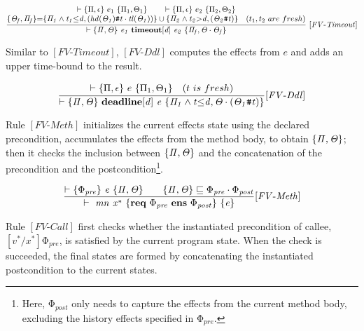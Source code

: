 \documentclass[acmsmall,10pt,review]{acmart}
\newcommand{\effect}{{\ensuremath{\mathrm{\Phi}}}}
\newcommand{\code}[1]{{\tt{\ensuremath{\m{#1}}}}}
\newcommand{\CONTAIN}{\sqsubseteq}
\newcommand{\m}{\mathit}
\newcommand{\mysharp}{{\mathrel{\texttt{\#}}}}
\begin{document}
{{{\small\begin{gather*}
  \code{\frac{
    \begin{matrix}
      \vdash \{\Pi, \epsilon \}\ e_1 \ \{  \Pi_1, \Theta_1\} 
      \qquad 
      \vdash \{ \Pi, \epsilon \}\ e_2 \ \{  \Pi_2, \Theta_2 \} 
      \\
      \s{\Theta_f, \Pi_f} {=} \s{\Pi_1  \wedge t_1{\leq}d, (hd(\Theta_1)\mysharp t \cdot tl(\Theta_1))}
      \cup 
  \s{\Pi_2  \wedge t_2{>}d,  (\Theta_2\mysharp t)}   
  \quad (t_1, t_2\ are\ fresh)     
\end{matrix}
  }
  {\vdash \s{ \Pi, \Theta} \  
  e_1\ \textbf{timeout} [d] \  e_2
   \ \s{\Pi_f, \Theta \cdot \Theta_f} } \   {[FV\text{-}Timeout]}} 
\end{gather*}}}


Similar to \code{[FV\text{-}Timeout]}, \code{[FV\text{-}Ddl]} computes the effects 
from \code{e} and adds an upper time-bound to the result. 

{{\small\begin{gather*}
  \code{\frac{
    \begin{matrix}
      \vdash \{ \Pi, \epsilon\}\ e \ \{  \Pi_1, \Theta_1\} 
  \quad (t\ is\ fresh)     
\end{matrix}
  }
  {\vdash \s{ \Pi, \Theta} \  
  \textbf{deadline}  [d] \ e 
   \ \s{\Pi_1  \wedge t{\leq}d, \Theta  \cdot (\Theta_1\mysharp t)} }   
    {[FV\text{-}Ddl]}} 
  \end{gather*}}}


  Rule \code{[FV\text{-}Meth]} initializes the current effects state 
using the declared precondition, accumulates the effects from the method body, 
to obtain \code{ \s{\Pi, \Theta}}; then  it
checks the  inclusion between \code{ \s{\Pi, \Theta}} and the concatenation of 
the precondition and the postcondition\footnote{Here, 
\code{\effect_{post}} only needs to capture the effects from the current method body, excluding the history effects specified in \code{\effect_{pre}}. }.
  
{{\small\begin{gather*}
\code{\frac{  \vdash \s{\effect_{pre}}
 \ e \  \{ \Pi, \Theta \} \qquad   \{ \Pi, \Theta \} \CONTAIN  
 \effect_{pre} \cdot \effect_{post}}{  \vdash  \ mn  \ {x^*}\ \{\textbf{req}\ \effect_{pre}\ 
  \textbf{ens}\  \effect_{post}\} \ \{ e \}}   {[FV\text{-}Meth]}}  
  \end{gather*}}}



Rule \code{[FV\text{-}Call]} first checks whether the instantiated 
  precondition of callee, \code{[v^*/x^*]\effect_{pre}}, is satisfied by 
  the current program state. When the check is succeeded, the final states are 
  formed by concatenating the  
  instantiated postcondition to the current states. 

}
\end{document}
